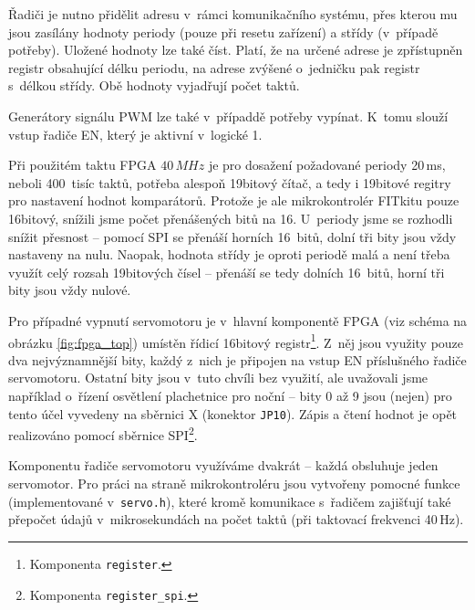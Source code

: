 Řadiči je nutno přidělit adresu v~rámci komunikačního systému, přes kterou mu
jsou zasílány hodnoty periody (pouze při resetu zařízení) a střídy (v~případě
potřeby). Uložené hodnoty lze také číst. Platí, že na určené adrese je
zpřístupněn registr obsahující délku periodu, na adrese zvýšené o~jedničku pak
registr s~délkou střídy. Obě hodnoty vyjadřují počet taktů.

Generátory signálu PWM lze také v~případdě potřeby vypínat. K~tomu slouží vstup
řadiče EN, který je aktivní v~logické 1.

Při použitém taktu FPGA $40\,MHz$ je pro dosažení požadované periody 20\,ms,
neboli 400~tisíc taktů, potřeba alespoň 19bitový čítač, a tedy i 19bitové
regitry pro nastavení hodnot komparátorů. Protože je ale mikrokontrolér FITkitu
pouze 16bitový, snížili jsme počet přenášených bitů na 16. U~periody jsme se
rozhodli snížit přesnost -- pomocí SPI se přenáší horních 16~bitů, dolní tři
bity jsou vždy nastaveny na nulu. Naopak, hodnota střídy je oproti periodě malá
a není třeba využít celý rozsah 19bitových čísel -- přenáší se tedy dolních
16~bitů, horní tři bity jsou vždy nulové.

Pro případné vypnutí servomotoru je v~hlavní komponentě FPGA (viz schéma na
obrázku \ref{fig:fpga_top}) umístěn řídicí 16bitový registr\footnote{Komponenta
\texttt{register}.}. Z~něj jsou využity pouze dva nejvýznamnější bity, každý
z~nich je připojen na vstup EN příslušného řadiče servomotoru. Ostatní bity jsou
v~tuto chvíli bez využití, ale uvažovali jsme například o~řízení osvětlení
plachetnice pro noční  -- bity 0 až 9 jsou (nejen) pro tento účel
vyvedeny na sběrnici X (konektor \texttt{JP10}). Zápis a čtení hodnot je opět
realizováno pomocí sběrnice SPI\footnote{Komponenta \texttt{register\_spi}.}.

Komponentu řadiče servomotoru využíváme dvakrát -- každá obsluhuje jeden
servomotor. Pro práci na straně mikrokontroléru jsou vytvořeny pomocné funkce
(implementované v~\texttt{servo.h}), které kromě komunikace s~řadičem zajišťují
také přepočet údajů v~mikrosekundách na počet taktů (při taktovací frekvenci
40\,Hz).



